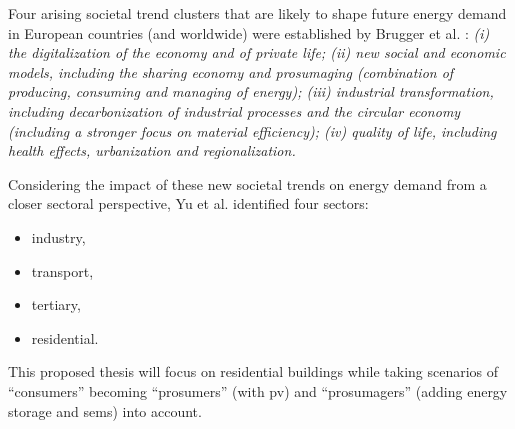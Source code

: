 Four arising societal trend clusters that are likely to shape future energy demand in European countries (and worldwide) were established by Brugger et al. \cite{2050}:  
\emph{
  (i) the digitalization of the economy and of private life; 
  (ii) new social and economic models, including the sharing economy and prosumaging (combination of producing, consuming and managing of energy); 
  (iii) industrial transformation, including decarbonization of industrial processes and the circular economy (including a stronger focus on material efficiency); 
  (iv) quality of life, including health effects, urbanization and regionalization. 
}


Considering the impact of these new societal trends on energy demand from a closer sectoral perspective,
Yu et al. \cite{newtrends} identified four sectors: 

\begin{itemize}
  \item industry, 
  \item transport,  
  \item tertiary, 
  \item residential.  
\end{itemize}

This proposed thesis will focus on residential buildings 
while taking scenarios of “consumers” becoming “prosumers” (with \gls{pv}) and “prosumagers” (adding energy storage and \gls{sems}) \cite{consumer} into account.  


